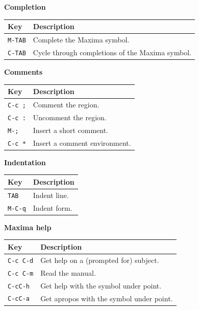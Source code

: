 \noindent
\textbf{Completion}

\smallskip

\noindent
\begin{tabular}{p{\firstcol}p{\secondcol}}
\hline
\textbf{Key} & \textbf{Description}\\
\hline
\texttt{M-TAB} & Complete the Maxima symbol.\\
\texttt{C-TAB} & Cycle through completions of the Maxima symbol.\\
\end{tabular}

\smallskip

\noindent
\textbf{Comments}

\smallskip

\noindent
\begin{tabular}{p{\firstcol}p{\secondcol}}
\hline
\textbf{Key} & \textbf{Description}\\
\hline
\texttt{C-c ;} & Comment the region.\\
\texttt{C-c :} & Uncomment the region.\\
\texttt{M-;} & Insert a short comment.\\
\texttt{C-c *} & Insert a comment environment.
\end{tabular}


\smallskip

\noindent
\textbf{Indentation}

\smallskip

\noindent
\begin{tabular}{p{\firstcol}p{\secondcol}}
\hline
\textbf{Key} & \textbf{Description}\\
\hline
\texttt{TAB} & Indent line.\\
\texttt{M-C-q} & Indent form.
\end{tabular}


\smallskip

\noindent
\textbf{Maxima help}

\smallskip

\noindent
\begin{tabular}{p{\firstcol}p{\secondcol}}
\hline
\textbf{Key} & \textbf{Description}\\
\hline
\texttt{C-c C-d}
& Get help on a (prompted for) subject.\\
\texttt{C-c C-m}
& Read the manual.\\
\texttt{C-cC-h} & Get help with the symbol under point.\\
\texttt{C-cC-a} & Get apropos with the symbol under point.
\end{tabular}

